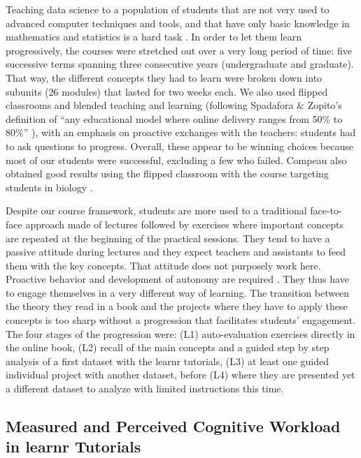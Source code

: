 \documentclass{aims} %
\theoremstyle{definition}
\begin{document}
Teaching data science to a population of students that are not very used
to advanced computer techniques and tools, and that have only basic
knowledge in mathematics and statistics is a hard task \cite{Sousa2018}.
In order to let them learn progressively, the courses were stretched out
over a very long period of time: five successive terms spanning three
consecutive years (undergraduate and graduate). That way, the different
concepts they had to learn were broken down into subunits (26 modules)
that lasted for two weeks each. We also used flipped classrooms and
blended teaching and learning (following Spadafora \& Zopito's
definition of ``any educational model where online delivery ranges from
50\% to 80\%'' \cite{Spadafora2018}), with an emphasis on proactive
exchanges with the teachers: students had to ask questions to progress.
Overall, these appear to be winning choices because most of our students
were successful, excluding a few who failed. Compeau also obtained good
results using the flipped classroom with the course targeting students
in biology \cite{Compeau2019}.

Despite our course framework, students are more used to a traditional
face-to-face approach made of lectures followed by exercises where
important concepts are repeated at the beginning of the practical
sessions. They tend to have a passive attitude during lectures and they
expect teachers and assistants to feed them with the key concepts. That
attitude does not purposely work here. Proactive behavior and
development of autonomy are required \cite{Freeman2014}. They thus have
to engage themselves in a very different way of learning. The transition
between the theory they read in a book and the projects where they have
to apply these concepts is too sharp without a progression that
facilitates students' engagement. The four stages of the progression
were: (L1) auto-evaluation exercises directly in the online book, (L2)
recall of the main concepts and a guided step by step analysis of a
first dataset with the learnr tutorials, (L3) at least one guided
individual project with another dataset, before (L4) where they are
presented yet a different dataset to analyze with limited instructions
this time.

\hypertarget{measured-and-perceived-cognitive-workload-in-learnr-tutorials-2}{%
\subsection{Measured and Perceived Cognitive Workload in learnr
Tutorials}\label{measured-and-perceived-cognitive-workload-in-learnr-tutorials-2}}
\end{document}
